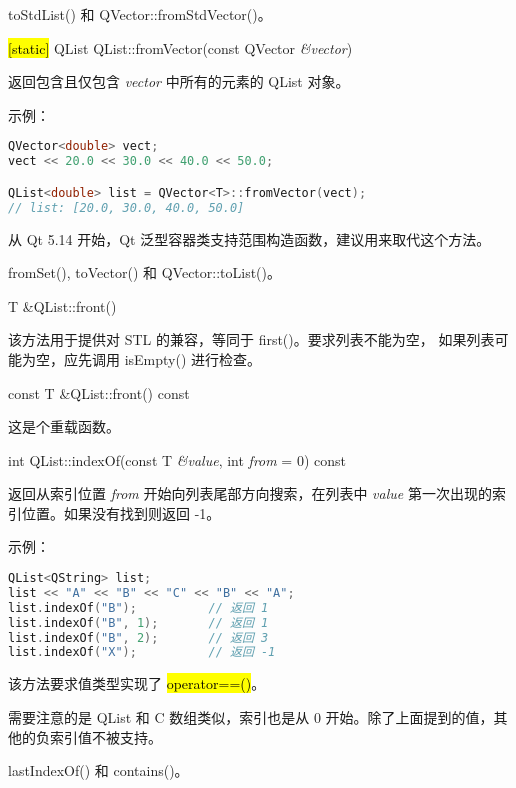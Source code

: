 \begin{notice}[另请参阅]
toStdList() 和 QVector::fromStdVector()。
\end{notice}


\hl{[static]} QList QList::fromVector(const QVector \emph{\&vector})

返回包含且仅包含 \emph{vector} 中所有的元素的 QList 对象。

示例：


\begin{lstlisting}[language=C++]
QVector<double> vect;
vect << 20.0 << 30.0 << 40.0 << 50.0;

QList<double> list = QVector<T>::fromVector(vect);
// list: [20.0, 30.0, 40.0, 50.0]
\end{lstlisting}


\begin{notice}
从 Qt 5.14 开始，Qt 泛型容器类支持范围构造函数，建议用来取代这个方法。
\end{notice}


\begin{notice}[另请参阅]
fromSet(), toVector() 和 QVector::toList()。
\end{notice}

T \&QList::front()

该方法用于提供对 STL 的兼容，等同于 first()。要求列表不能为空， 如果列表可能为空，应先调用 isEmpty() 进行检查。

const T \&QList::front() const

这是个重载函数。

int QList::indexOf(const T \emph{\&value}, int \emph{from} = 0) const

返回从索引位置 \emph{from} 开始向列表尾部方向搜索，在列表中 \emph{value} 第一次出现的索引位置。如果没有找到则返回 -1。

示例：



\begin{lstlisting}[language=C++]
QList<QString> list;
list << "A" << "B" << "C" << "B" << "A";
list.indexOf("B");          // 返回 1
list.indexOf("B", 1);       // 返回 1
list.indexOf("B", 2);       // 返回 3
list.indexOf("X");          // 返回 -1
\end{lstlisting}



该方法要求值类型实现了 \hl{operator==()}。

需要注意的是 QList 和 C 数组类似，索引也是从 0 开始。除了上面提到的值，其他的负索引值不被支持。

\begin{notice}[另请参阅]
lastIndexOf() 和 contains()。
\end{notice}


